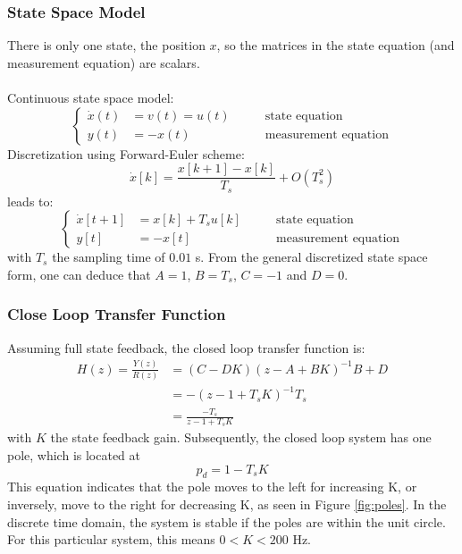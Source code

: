\documentclass[a4paper,kul]{kulakarticle} %
\begin{document}
\subsubsection*{State Space Model}
There is only one state, the position $x$, so the matrices in the state equation (and measurement equation) are scalars. 
\\\\
Continuous state space model:
\begin{equation}
\left\{
	\begin{split}
	\dot{x}(t) &= v(t) = u(t) \qquad &\text{state equation} \\
	y(t) &= -x(t) &\text{measurement equation}
	\end{split}
	\right.
\end{equation}
Discretization using Forward-Euler scheme:
\begin{equation}
	\dot{x}[k] = \frac{x[k+1] - x[k]}{T_s} + O(T_s^2)
\end{equation}
leads to:
\begin{equation}
\left\{
\begin{split}
\dot{x}[t+1] &= x[k] + T_s u[k] \qquad &\text{state equation} \\
y[t] &= -x[t] &\text{measurement equation}
\end{split}
\right.
\end{equation}
with $T_s$ the sampling time of $0.01$ s. From the general discretized state space form, one can deduce that $A = 1$, $B = T_s$, $C = -1$ and $D = 0$.

\subsubsection*{Close Loop Transfer Function}
Assuming full state feedback, the closed loop transfer function is:
\begin{equation}
	\begin{split}
	H(z) = \frac{Y(z)}{R(z)} &= (C-DK)(z - A + BK)^{-1}B + D \\
	&= -(z-1 + T_s K)^{-1} T_s \\
	&= \frac{-T_s}{z-1+T_sK}
	\end{split}
\end{equation}
with $K$ the state feedback gain. Subsequently, the closed loop system has one pole, which is located at
\begin{equation}
	p_d = 1 - T_s K
\end{equation}
This equation indicates that the pole moves to the left for increasing K, or inversely, move to the right for decreasing K, as seen in Figure \ref{fig:poles}. In the discrete time domain, the system is stable if the poles are within the unit circle. For this particular system, this means $0 < K < 200$ Hz.
\end{document}

